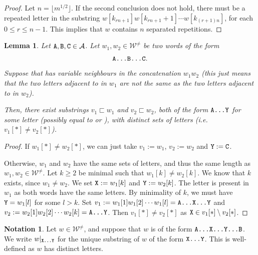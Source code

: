 \documentclass[11pt]{amsart}
\newtheorem{lemma}[theorem]{Lemma}
\theoremstyle{definition}
\newtheorem{notation}[theorem]{Notation}
\renewcommand{\leq}{\leqslant}
\renewcommand{\geq}{\geqslant}
\newcommand{\upletters}[1]{{\normalfont{\texttt{#1}}}}
\newcommand{\word}{\mathcal{W}}
\newcommand{\letters}[1]{#1[*]}
\newcommand{\thisM}{m}
\begin{document}
\begin{proof}
Let $n = \lfloor \thisM^{1/2}\rfloor$. If the second conclusion does not hold, there must be a repeated letter in the substring $w[k_{rn+1}]w[k_{rn+1}+1]\cdots w[k_{(r+1)n}]$, for each $0\leq r\leq n-1$. This implies that $w$ contains $n$ separated repetitions.
\end{proof}

\begin{lemma}
\label{lem:unpredstep1}
Let $\upletters{A}, \upletters{B}, \upletters{C}\in \mathcal{A}$. Let $w_1, w_2\in \word^{\neq}$ be two words of the form
\begin{equation*}
\upletters{A\ldots B\ldots C}.
\end{equation*}
Suppose that \upletters{B} has variable neighbours in the concatenation $w_1w_2$ (this just means that the two letters adjacent to \upletters{B} in $w_1$ are not the same as the two letters adjacent to \upletters{B} in $w_2$).

Then, there exist substrings $v_1 \sqsubset w_1$ and $v_2 \sqsubset w_2$, both of the form $\upletters{A\ldots Y}$ for some letter \upletters{Y} (possibly equal to \upletters{B} or \upletters{C}), with distinct sets of letters (i.e.~$\letters{v_1} \neq \letters{v_2}$).
\end{lemma}

\begin{proof}
If $\letters{w_1} \neq \letters{w_2}$, we can just take $v_1 := w_1$, $v_2 := w_2$ and $\upletters{Y} := \upletters{C}$. 

Otherwise, $w_1$ and $w_2$ have the same sets of letters, and thus the same length as $w_1, w_2\in \word^{\neq}$. Let $k\geq 2$ be minimal such that $w_1[k] \neq w_2[k]$. We know that $k$ exists, since $w_1\neq w_2$. We set $\upletters{X} := w_1[k]$ and $\upletters{Y} := w_2[k]$. The letter \upletters{Y} is present in $w_1$ as both words have the same letters. By minimality of $k$, we must have $\upletters{Y} = w_1[l]$ for some $l>k$. Set ${v_1 := w_1[1]w_1[2]\cdots w_1[l] = \upletters{A\ldots X\ldots Y}}$ and $v_2 := w_2[1]w_2[2]\cdots w_2[k] = \upletters{A\ldots Y}$. Then $\letters{v_1}\neq \letters{v_2}$ as $\upletters{X} \in \letters{v_1}\setminus \letters{v_2}$.
\end{proof}

\begin{notation}
\label{not:substring}
Let $w\in \word^{\neq}$, and suppose that $w$ is of the form $\upletters{A\ldots X\ldots Y\ldots B}$. We write $w|_{\upletters{X\ldots Y}}$ for the unique substring of $w$ of the form $\upletters{X\ldots Y}$. This is well-defined as $w$ has distinct letters.
\end{notation}
\end{document}
